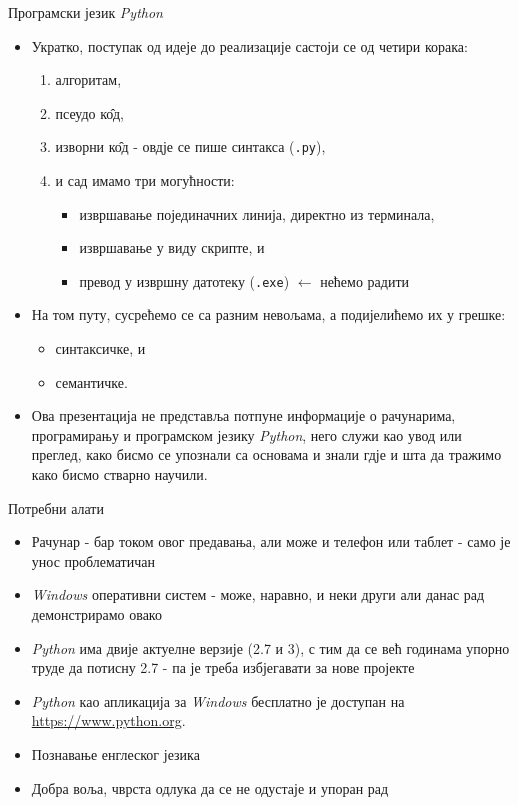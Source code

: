 \documentclass{beamer}
\begin{document}
\begin{frame}{Програмски језик \textit{Python}}
\begin{itemize}
    \item Укратко, поступак од идеје до реализације састоји се од четири корака:
    \begin{enumerate}
        \item алгоритам,
        \item псеудо к\^{о}д,
        \item изворни к\^{о}д - овдје се пише синтакса (\texttt{.py}),
        \item и сад имамо три могућности:
        \begin{itemize}
            \item извршавање појединачних линија, директно из терминала,
            \item извршавање у виду скрипте, и
            \item превод у извршну датотеку (\texttt{.exe}) $\leftarrow$ нећемо радити
        \end{itemize}
    \end{enumerate}
    \item На том путу, сусрећемо се са разним невољама, а подијелићемо их у грешке:
    \begin{itemize}
        \item синтаксичке, и
        \item семантичке.
    \end{itemize}
    \item Ова презентација не представља потпуне информације о рачунарима, програмирању и програмском језику \textit{Python}, него служи као увод или преглед, како бисмо се упознали са основама и знали гдје и шта да тражимо како бисмо стварно научили.
\end{itemize}
\end{frame}

\begin{frame}{Потребни алати}
\begin{itemize}
    \item Рачунар - бар током овог предавања, али може и телефон или таблет - само је унос проблематичан
    \item \textit{Windows} оперативни систем - може, наравно, и неки други али данас рад демонстрирамо овако
    \item \textit{Python} има двије актуелне верзије (2.7 и 3), с тим да се већ годинама упорно труде да потисну 2.7 - па је треба избјегавати за нове пројекте
    \item \textit{Python} као апликација за \textit{Windows} бесплатно је доступан на \color{violet}\href{python.org}{https://www.python.org}\color{black}.
    \item Познавање енглеског језика
    \item Добра воља, чврста одлука да се не одустаје и упоран рад
\end{itemize}
\end{frame}
\end{document}
